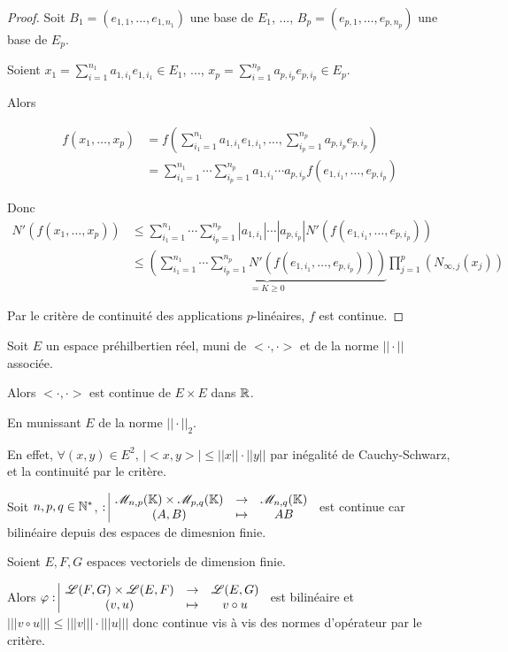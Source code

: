 \begin{proof}
    Soit $B_1 = (e_{1, 1}, \ldots, e_{1, n_1})$ une base de $E_1$, ..., $B_p = (e_{p, 1}, \ldots, e_{p, n_p})$ une base de $E_p$.

    Soient $\displaystyle x_1 = \sum_{i=1}^{n_1} a_{1, i_1} e_{1, i_1} \in E_1$, ..., $\displaystyle x_p = \sum_{i=1}^{n_p} a_{p, i_p} e_{p, i_p} \in E_p$.

    Alors 
    
    \begin{align*}
        f(x_1, \ldots, x_p) & = f\left( \sum_{i_1=1}^{n_1} a_{1, i_1} e_{1, i_1}, \ldots, \sum_{i_p=1}^{n_p} a_{p, i_p} e_{p, i_p} \right) \\
        & = \sum_{i_1=1}^{n_1} \cdots \sum_{i_p=1}^{n_p} a_{1, i_1} \cdots a_{p, i_p} f(e_{1, i_1}, \ldots, e_{p, i_p}) 
    \end{align*}

    Donc 
    \begin{align*}
        N'(f(x_1, \ldots, x_p)) & \leqslant \sum_{i_1=1}^{n_1} \cdots \sum_{i_p=1}^{n_p} |a_{1, i_1}| \cdots |a_{p, i_p}| N'(f(e_{1, i_1}, \ldots, e_{p, i_p})) \\
        & \leqslant \underbrace{\left( \sum_{i_1=1}^{n_1} \cdots \sum_{i_p=1}^{n_p} N'(f(e_{1, i_1}, \ldots, e_{p, i_p})) \right)}_{ = K \geqslant 0} \prod_{j=1}^p \left( N_{\infty, j}(x_j) \right)
    \end{align*}

    Par le critère de continuité des applications $p$-linéaires, $f$ est continue.
    
\end{proof}

\begin{exemple}
    Soit $E$ un espace préhilbertien réel, muni de $<\cdot, \cdot>$ et de la norme $||\cdot||$ associée.

    Alors $<\cdot, \cdot>$ est continue de $E \times E$ dans $\mathbb{R}$. 

    En munissant $E$ de la norme $||\cdot||_2$. 

    En effet, $\forall (x, y) \in E^2, \, |<x, y>| \leqslant ||x|| \cdot ||y||$ par inégalité de Cauchy-Schwarz,
    et la continuité par le critère. 

    \lvspace Soit $n, p, q \in \mathbb{N}^*$, $: \space \begin{array}{|ccc} \displaystyle \mathscr M_{n, p}(\mathbb{K}) \times \mathscr M_{p, q}(\mathbb{K}) & \to & \displaystyle \mathscr M_{n, q}(\mathbb{K}) \\ \displaystyle (A, B) & \mapsto & \displaystyle AB \end{array}$ est
    continue car bilinéaire depuis des espaces de dimesnion finie. 


    \lvspace Soient $E, F, G$ espaces vectoriels de dimension finie.
    
    Alors $\varphi: \space \begin{array}{|ccc} \displaystyle \mathscr L(F, G) \times \mathscr L(E, F) & \to & \displaystyle \mathscr L(E, G) \\ \displaystyle (v, u) & \mapsto & \displaystyle v \circ u \end{array}$ est bilinéaire
    et $||| v \circ u||| \leqslant |||v||| \cdot |||u|||$ donc continue vis à vis des normes d'opérateur par 
    le critère. 
\end{exemple}


